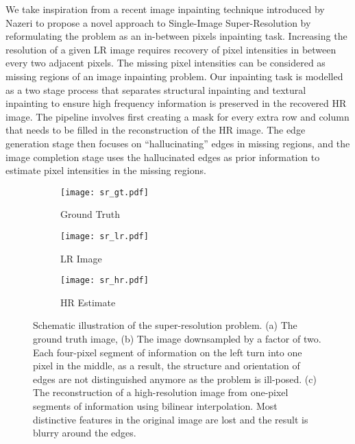 \documentclass[10pt,twocolumn,letterpaper]{article}
\begin{document}
We take inspiration from a recent image inpainting technique introduced by Nazeri \etal \cite{nazeri2019edgeconnect} to propose a novel approach to Single-Image Super-Resolution by reformulating the problem as an in-between pixels inpainting task. Increasing the resolution of a given LR image requires recovery of pixel intensities in between every two adjacent pixels. The missing pixel intensities can be considered as missing regions of an image inpainting problem. Our inpainting task is modelled as a two stage process that separates structural inpainting and textural inpainting to ensure high frequency information is preserved in the recovered HR image. The pipeline involves first creating a mask for every extra row and column that needs to be filled in the reconstruction of the HR image. The edge generation stage then focuses on ``hallucinating'' edges in missing regions, and the image completion stage uses the hallucinated edges as prior information to estimate pixel intensities in the missing regions. 

\begin{figure}[h]
	\centering
	\begin{subfigure}{.14\textwidth}
		\centering
		\texttt{[image: sr\_gt.pdf]}
		\caption{Ground Truth}
	\end{subfigure}
	\begin{subfigure}{.14\textwidth}
		\centering
		\texttt{[image: sr\_lr.pdf]}
		\caption{LR Image}
	\end{subfigure}
	\begin{subfigure}{.14\textwidth}
		\centering
		\texttt{[image: sr\_hr.pdf]}
		\caption{HR Estimate}
	\end{subfigure}
	\caption{Schematic illustration of the super-resolution problem. (a) The ground truth image, (b) The image downsampled by a factor of two. Each four-pixel segment of information on the left turn into one pixel in the middle, as a result, the structure and orientation of edges are not distinguished anymore as the problem is ill-posed. (c) The reconstruction of a high-resolution image from one-pixel segments of information using bilinear interpolation. Most distinctive features in the original image are lost and the result is blurry around the edges. }
	\label{fig:sr}
\end{figure}
\end{document}

